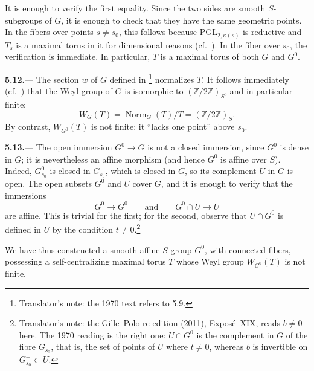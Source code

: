 It is enough to verify the first equality.  Since the two sides are
smooth \(S\)-subgroups of \(G\), it is enough to check that they have
the same geometric points.  In the fibers over points \(s\ne s_0\),
this follows because \(\mathrm{PGL}_{2,\kappa(s)}\) is reductive and
\(T_s\) is a maximal torus in it for dimensional reasons
\textup{(cf.\ )}.  In the fiber over \(s_0\), the verification is
immediate.  In particular, \(T\) is a maximal torus of both \(G\)
and \(G^0\).

\par\medskip\noindent
\textbf{5.12.}---
The section \(w\) of \(G\) defined in \footnote{Translator's note: the 1970 text refers to 5.9.} normalizes \(T\).
It follows immediately \textup{(cf.\ )} that the Weyl group of
\(G\) is isomorphic to \((\mathbb Z/2\mathbb Z)_S\), and in particular
finite:
\[
  W_G(T)=\operatorname{Norm}_G(T)/T
        =(\mathbb Z/2\mathbb Z)_S.
\]
By contrast, \(W_{G^0}(T)\) is not finite: it ``lacks one
point'' above \(s_0\).

\par\medskip\noindent
\textbf{5.13.}---
The open immersion \(G^0\to G\) is not a closed immersion, since
\(G^0\) is dense in \(G\); it is nevertheless an affine morphism
\textup{(and hence \(G^0\) is affine over \(S\))}.  Indeed,
\(G^0_{s_0}\) is closed in \(G_{s_0}\), which is closed in \(G\), so
its complement \(U\) in \(G\) is open.  The open subsets \(G^0\) and
\(U\) cover \(G\), and it is enough to verify that the immersions
\[
  G^0\longrightarrow G^0
  \qquad\text{and}\qquad
  G^0\cap U\longrightarrow U
\]
are affine.  This is trivial for the first; for the second, observe
that \(U\cap G^0\) is defined in \(U\) by the condition \(t\ne0\).\footnote{Translator's note: the Gille--Polo re-edition (2011), Exposé~XIX, reads
\(b\ne0\) here. The 1970 reading is the right one: \(U\cap G^0\) is the
complement in \(G\) of the fibre \(G_{s_0}\), that is, the set of points of
\(U\) where \(t\ne0\), whereas \(b\) is invertible on \(G^-_{s_0}\subset U\).}

We have thus constructed a smooth affine \(S\)-group \(G^0\), with
connected fibers, possessing a self-centralizing maximal torus \(T\)
whose Weyl group \(W_{G^0}(T)\) is not finite.


